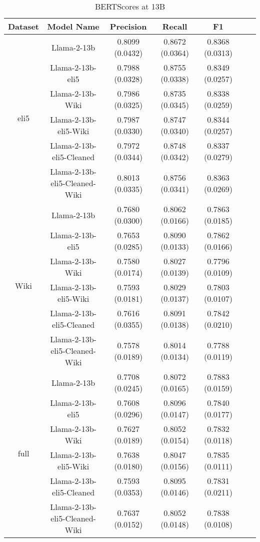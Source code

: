 \documentclass[11pt, oneside]{article}   	%
\begin{document}
\begin{table}
\centering
\begin{tabular}{ccccccc}
\hline
Dataset & Model Name & Precision & Recall & F1 \\

\hline
\multirow{6}{*}{eli5} & Llama-2-13b & 0.8099 (0.0432) & 0.8672 (0.0364) & 0.8368 (0.0313) \\
 & Llama-2-13b-eli5 & 0.7988 (0.0328) & 0.8755 (0.0338) & 0.8349 (0.0257) \\
 & Llama-2-13b-Wiki & 0.7986 (0.0325) & 0.8735 (0.0345) & 0.8338 (0.0259) \\
  & Llama-2-13b-eli5-Wiki & 0.7987 (0.0330) & 0.8747 (0.0340) & 0.8344 (0.0257) \\
 & Llama-2-13b-eli5-Cleaned & 0.7972 (0.0344) & 0.8748 (0.0342) & 0.8337 (0.0279) \\
 & Llama-2-13b-eli5-Cleaned-Wiki & 0.8013 (0.0335) & 0.8756 (0.0341) & 0.8363 (0.0269) \\
\hline
\multirow{6}{*}{Wiki} & Llama-2-13b & 0.7680 (0.0300) & 0.8062 (0.0166) & 0.7863 (0.0185) \\
 & Llama-2-13b-eli5 & 0.7653 (0.0285) & 0.8090 (0.0133) & 0.7862 (0.0166) \\
 & Llama-2-13b-Wiki & 0.7580 (0.0174) & 0.8027 (0.0139) & 0.7796 (0.0109) \\
  & Llama-2-13b-eli5-Wiki & 0.7593 (0.0181) & 0.8029 (0.0137) & 0.7803 (0.0107) \\
 & Llama-2-13b-eli5-Cleaned & 0.7616 (0.0355) & 0.8091 (0.0138) & 0.7842 (0.0210) \\
 & Llama-2-13b-eli5-Cleaned-Wiki & 0.7578 (0.0189) & 0.8014 (0.0134) & 0.7788 (0.0119) \\
 \hline
\multirow{6}{*}{full} & Llama-2-13b & 0.7708 (0.0245) & 0.8072 (0.0165) & 0.7883 (0.0159) \\
 & Llama-2-13b-eli5 & 0.7608 (0.0296) & 0.8096 (0.0147) & 0.7840 (0.0177) \\
 & Llama-2-13b-Wiki & 0.7627 (0.0189) & 0.8052 (0.0154) & 0.7832 (0.0118) \\
  & Llama-2-13b-eli5-Wiki & 0.7638 (0.0180) & 0.8047 (0.0156) & 0.7835 (0.0111) \\
 & Llama-2-13b-eli5-Cleaned & 0.7593 (0.0353) & 0.8095 (0.0146) & 0.7831 (0.0211) \\
 & Llama-2-13b-eli5-Cleaned-Wiki & 0.7637 (0.0152) & 0.8052 (0.0148) & 0.7838 (0.0108) \\
\hline
\end{tabular}
\caption{BERTScores at 13B}
\label{tab:bertscores_13B}
\end{table}
\end{document}
